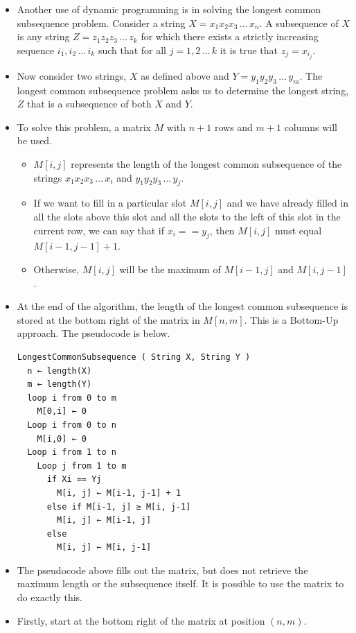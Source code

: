 \documentclass{article}
\begin{document}
\begin{itemize}
    \begin{itemize}
        \item Another use of dynamic programming is in solving the longest common subsequence problem. Consider a string \(X=x_1x_2x_3\,\hdots\,x_n\). A subsequence of \(X\) is any string \(Z=z_1z_2z_3\,\hdots\,z_k\) for which there exists a strictly increasing sequence \(i_1, i_2\,\hdots\,i_k\) such that for all \(j=1,2\,\hdots\,k\) it is true that \(z_j=x_{i_j}\).
        \item Now consider two strings, \(X\) as defined above and \(Y=y_1y_2y_3\,\hdots\,y_m\). The longest common subsequence problem asks us to determine the longest string, \(Z\) that is a subsequence of both \(X\) and \(Y\).
        \item To solve this problem, a matrix \(M\) with \(n+1\) rows and \(m+1\) columns will be used.
        \begin{itemize}
            \item \(M[i,j]\) represents the length of the longest common subsequence of the strings \(x_1x_2x_3\,\hdots\,x_i\) and \(y_1y_2y_3\,\hdots\,y_j\).
            \item If we want to fill in a particular slot \(M[i,j]\) and we have already filled in all the slots above this slot and all the slots to the left of this slot in the current row, we can say that if \(x_i==y_j\), then \(M[i,j]\) must equal \(M[i-1,j-1]+1\).
            \item Otherwise, \(M[i,j]\) will be the maximum of \(M[i-1,j]\) and \(M[i,j-1]\).
        \end{itemize}
        \item At the end of the algorithm, the length of the longest common subsequence is stored at the bottom right of the matrix in \(M[n,m]\). This is a Bottom-Up approach. The pseudocode is below.
\begin{verbatim}
LongestCommonSubsequence ( String X, String Y )
  n ← length(X)
  m ← length(Y)
  loop i from 0 to m
    M[0,i] ← 0
  Loop i from 0 to n
    M[i,0] ← 0
  Loop i from 1 to n
    Loop j from 1 to m
      if Xi == Yj
        M[i, j] ← M[i-1, j-1] + 1
      else if M[i-1, j] ≥ M[i, j-1]
        M[i, j] ← M[i-1, j]
      else
        M[i, j] ← M[i, j-1]
\end{verbatim}
        \item The pseudocode above fills out the matrix, but does not retrieve the maximum length or the subsequence itself. It is possible to use the matrix to do exactly this.
        \item Firstly, start at the bottom right of the matrix at position \((n,m)\).

\end{itemize}
\end{itemize}
\end{document}
